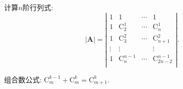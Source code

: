 \documentclass[lang=cn,newtx,10pt,scheme=chinese]{elegantbook}
\begin{document}
\begin{exercise}
计算$n$阶行列式:
\begin{equation}
|\boldsymbol{A}|=\left| \begin{matrix}
1&		1&		\cdots&		1\\
1&		\mathrm{C}_{2}^{1}&		\cdots&		\mathrm{C}_{n}^{1}\\
1&		\mathrm{C}_{3}^{2}&		\cdots&		\mathrm{C}_{n+1}^{2}\\
\vdots&		\vdots&		&		\vdots\\
1&		\mathrm{C}_{n}^{n-1}&		\cdots&		\mathrm{C}_{2n-2}^{n-1}\\
\end{matrix} \right|.
\nonumber
\end{equation}
\begin{note}
组合数公式:
$\mathrm{C}_{m}^{k-1}+\mathrm{C}_{m}^{k}=\mathrm{C}_{m+1}^{k}$.


\end{note}
\end{exercise}
\end{document}
